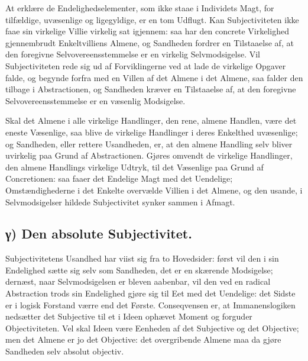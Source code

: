 \documentclass[12pt]{book}
\newcommand{\opage}[1]{\marginnote{\footnotesize\textit{[#1]}}}
\begin{document}
At erklære de Endelighedselementer, som ikke staae i Individets
Magt, for tilfældige, uvæsenlige og ligegyldige, er en tom Udflugt.
Kan Subjectiviteten ikke faae sin virkelige Villie virkelig sat
igjennem: saa har den concrete Virkelighed gjennembrudt
Enkeltvilliens Almene, og Sandheden fordrer en Tilstaaelse af, at
den foregivne Selvovereensstemmelse er en virkelig Selvmodsigelse.
Vil Subjectiviteten rede sig ud af Forviklingerne ved at lade de
virkelige Opgaver falde, og begynde forfra med en Villen af det
Almene i det Almene, saa falder den tilbage i Abstractionen, og
\opage{58} %
Sandheden kræver en Tilstaaelse af, at den foregivne
Selvovereensstemmelse er en væsenlig Modsigelse.

Skal det Almene i alle virkelige Handlinger, den rene, almene
Handlen, være det eneste Væsenlige, saa blive de virkelige
Handlinger i deres Enkelthed uvæsenlige; og Sandheden, eller rettere
Usandheden, er, at den almene Handling selv bliver uvirkelig paa
Grund af Abstractionen. Gjøres omvendt de virkelige Handlinger, den
almene Handlings virkelige Udtryk, til det Væsenlige paa Grund af
Concretionen: saa faaer det Endelige Magt med det Uendelige;
Omstændighederne i det Enkelte overvælde Villien i det Almene, og
den usande, i Selvmodsigelser hildede Subjectivitet synker sammen i
Afmagt.

\subsection*{γ) Den absolute Subjectivitet.}

Subjectivitetens Usandhed har viist sig fra to Hovedsider: først vil
den i sin Endelighed sætte sig selv som Sandheden, det er en
skærende Modsigelse; dernæst, naar Selvmodsigelsen er bleven
aabenbar, vil den ved en radical Abstraction trods sin Endelighed
gjøre sig til Eet med det Uendelige: det Sidste er i logisk Forstand
værre end det Første. Conseqvensen er, at Immanenslogiken nedsætter
det Subjective til et i Ideen ophævet Moment og forguder
Objectiviteten. Vel skal Ideen være Eenheden af det Subjective og
det Objective; men det Almene er jo det Objective: det overgribende
Almene maa da gjøre Sandheden selv absolut objectiv.
\end{document}
